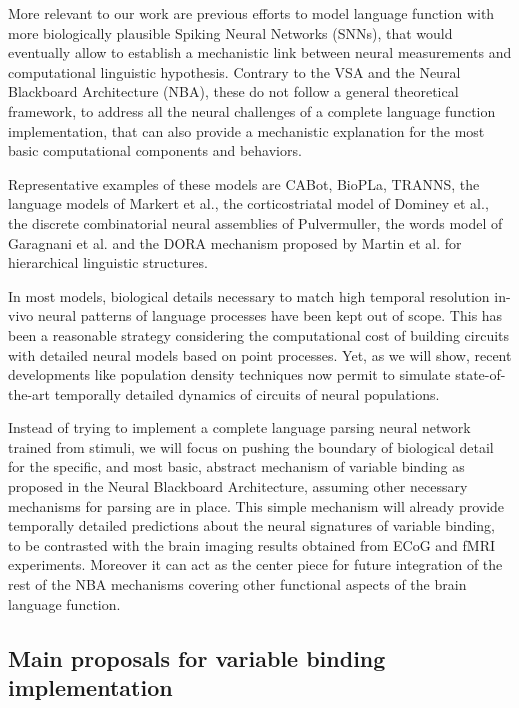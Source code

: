 \documentclass[10pt]{article}
\begin{document}
More relevant to our work are previous efforts to model language function with more biologically plausible Spiking Neural Networks (SNNs), 
that would eventually allow to establish a mechanistic link between neural measurements and computational linguistic hypothesis.
Contrary to the VSA and the Neural Blackboard Architecture (NBA)\cite{van_der_Velde_2006}, these do not follow a general theoretical framework, to address all the neural challenges of a complete language function implementation, that can also provide a mechanistic explanation for the most basic computational components and behaviors.

Representative examples of these models are CABot\cite{Huyck_2009}, BioPLa\cite{rosa2004thematic}, TRANNS\cite{bocancia2014psycholinguistically}, the language models of Markert et al.\cite{Markert_2007}, the corticostriatal model of Dominey et al.\cite{Dominey_2009}, the discrete combinatorial neural assemblies of Pulvermuller\cite{Pulverm_ller_2009, Pulverm_ller_2010}, the words model of Garagnani et al.\cite{Garagnani_2017} and the DORA mechanism proposed by Martin et al. for hierarchical linguistic structures\cite{Martin_2017}.

In most models, biological details necessary to match high temporal resolution in-vivo neural patterns of language processes have been kept out of scope.
This has been a reasonable strategy considering the computational cost of building circuits with detailed neural models based on point processes.
Yet, as we will show, recent developments like population density
techniques\cite{de2013generica} now permit to simulate state-of-the-art temporally detailed dynamics of circuits of neural populations.

Instead of trying to implement a complete language parsing neural network trained from stimuli, we will focus on pushing the boundary of biological detail for the specific, and most basic, abstract mechanism of variable binding as proposed in the Neural Blackboard Architecture\cite{van_der_Velde_2006}, assuming other necessary mechanisms for parsing are in place.
This simple mechanism will already provide temporally detailed predictions about the neural signatures of variable binding, to be contrasted with the brain imaging results obtained from ECoG and fMRI experiments.
Moreover it can act as the center piece for future integration of the rest of the NBA mechanisms covering other functional aspects of the brain language function.


\subsection{Main proposals for variable binding implementation}
\end{document}
